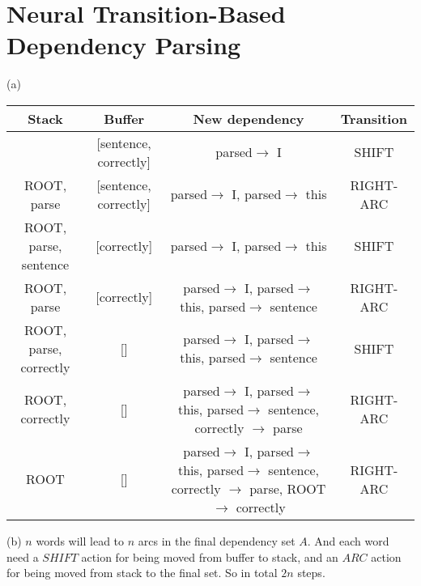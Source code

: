 \documentclass[11pt]{article}
\begin{document}
\section{Neural Transition-Based Dependency Parsing}
(a) 
\begin{center}
\begin{tabular}{ c|c|c|c } 
Stack & Buffer & New dependency & Transition \\ 
\hline
[ROOT, parsed, this] & [sentence, correctly] & parsed$\rightarrow$ I & SHIFT \\ 
\hline
ROOT, parse & [sentence, correctly] & parsed$\rightarrow$ I, parsed$\rightarrow$ this & RIGHT-ARC \\
\hline
ROOT, parse, sentence & [correctly] & parsed$\rightarrow$ I, parsed$\rightarrow$ this & SHIFT \\ 
\hline
ROOT, parse & [correctly] & parsed$\rightarrow$ I, parsed$\rightarrow$ this, parsed$\rightarrow$ sentence & RIGHT-ARC \\
\hline
ROOT, parse, correctly & [] & parsed$\rightarrow$ I, parsed$\rightarrow$ this, parsed$\rightarrow$ sentence & SHIFT \\
\hline
ROOT, correctly & [] & \shortstack{parsed$\rightarrow$ I, parsed$\rightarrow$ this,\\ parsed$\rightarrow$ sentence, correctly $\rightarrow$ parse} & RIGHT-ARC \\
\hline
ROOT & [] & \shortstack{parsed$\rightarrow$ I, parsed$\rightarrow$ this, \\ \newline parsed$\rightarrow$ sentence, \\ correctly $\rightarrow$ parse, ROOT $\rightarrow$ correctly} & RIGHT-ARC \\
\end{tabular}
\end{center}
(b) $n$ words will lead to $n$ arcs in the final dependency set $A$. And each word need a $SHIFT$ action for being moved from buffer to stack, and an $ARC$ action for being moved from stack to the final set. So in total $2n$ steps.
\end{document}
